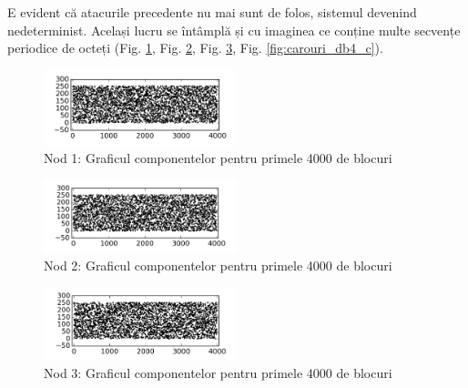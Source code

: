\documentclass[oneside, 12pt]{book}
\begin{document}
\clearpage
E evident că atacurile precedente nu mai sunt de folos, sistemul devenind nedeterminist. Același lucru se întâmplă și cu imaginea ce conține multe secvențe periodice de octeți (Fig. \ref{fig:carouri_db1_c}, Fig. \ref{fig:carouri_db2_c}, Fig. \ref{fig:carouri_db3_c}, Fig. \ref{fig:carouri_db4_c}).

\begin{figure}[h]
\begin{center}
\includegraphics[width=0.5\textwidth]{img/carouri_db1_c.png}    %
\caption{Nod 1: Graficul componentelor pentru primele 4000 de blocuri} 
\label{fig:carouri_db1_c}
\end{center}
\end{figure}

\begin{figure}[h]
\begin{center}
\includegraphics[width=0.5\textwidth]{img/carouri_db2_c.png}    %
\caption{Nod 2: Graficul componentelor pentru primele 4000 de blocuri} 
\label{fig:carouri_db2_c}
\end{center}
\end{figure}

\begin{figure}[h]
\begin{center}
\includegraphics[width=0.5\textwidth]{img/carouri_db3_c.png}    %
\caption{Nod 3: Graficul componentelor pentru primele 4000 de blocuri} 
\label{fig:carouri_db3_c}
\end{center}
\end{figure}
\end{document}
